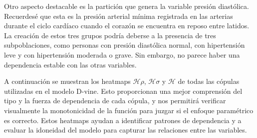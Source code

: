 Otro aspecto destacable es la partición que genera la variable presión diastólica. Recuerdesé que esta es la presión arterial mínima registrada en las arterias durante el ciclo cardíaco cuando el corazón se encuentra en reposo entre latidos. La creación de estos tres grupos podría deberse a la presencia de tres subpoblaciones, como personas con presión diastólica normal, con hipertensión leve y con hipertensión moderada o grave. Sin embargo, no parece haber una dependencia estable con las otras variables.

A continuación se muestran los heatmaps $\mathscr{H}\rho$, $\mathscr{H}\sigma$ y $\mathscr{H}$ de todas las cópulas utilizadas en el modelo D-vine. Esto proporcionan una mejor comprensión del tipo y la fuerza de dependencia de cada cópula, y nos permitirá verificar visualmente la monotonicidad de la función para juzgar si el enfoque paramétrico es correcto. Estos heatmaps ayudan a identificar patrones de dependencia y a evaluar la idoneidad del modelo para capturar las relaciones entre las variables.



\begin{figure}[H]
 \centering
\end{figure}

